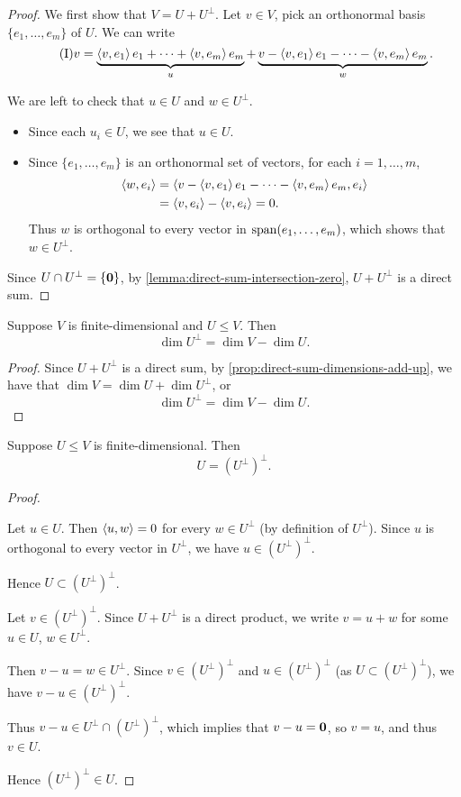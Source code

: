 \begin{proof}
We first show that $V=U+U^\perp$. Let $v\in V$, pick an orthonormal basis $\{e_1,\dots,e_m\}$ of $U$. We can write
\begin{equation*}\tag{I}
v=\underbrace{\left\langle v,e_1\right\rangle e_1+\cdots+\left\langle v,e_m\right\rangle e_m}_{u}+\underbrace{v-\left\langle v,e_1\right\rangle e_1-\cdots-\left\langle v,e_m\right\rangle e_m}_{w}.
\end{equation*}

We are left to check that $u\in U$ and $w\in U^\perp$.
\begin{itemize}
\item Since each $u_i\in U$, we see that $u\in U$.
\item Since $\{e_1,\dots,e_m\}$ is an orthonormal set of vectors, for each $i=1,\dots,m$,
\begin{align*}
\left\langle w,e_i\right\rangle
&=\left\langle v-\left\langle v,e_1\right\rangle e_1-\cdots-\left\langle v,e_m\right\rangle e_m,e_i\right\rangle\\
&=\left\langle v,e_i\right\rangle-\left\langle v,e_i\right\rangle=0.
\end{align*}
Thus $w$ is orthogonal to every vector in $\operatorname{span}(e_1,\dots,e_m)$, which shows that $w\in U^\perp$.
\end{itemize}

Since $U\cap U^\perp=\{\vb{0}\}$, by \ref{lemma:direct-sum-intersection-zero}, $U+U^\perp$ is a direct sum.
\end{proof}

\begin{corollary}
Suppose $V$ is finite-dimensional and $U\le V$. Then
\[\dim U^\perp=\dim V-\dim U.\]
\end{corollary}

\begin{proof}
Since $U+U^\perp$ is a direct sum, by \ref{prop:direct-sum-dimensions-add-up}, we have that $\dim V=\dim U+\dim U^\perp$, or
\[\dim U^\perp=\dim V-\dim U.\]
\end{proof}

\begin{corollary}
Suppose $U\le V$ is finite-dimensional. Then
\[U=(U^\perp)^\perp.\]
\end{corollary}

\begin{proof} \

\fbox{$\subset$} Let $u\in U$. Then $\left\langle u,w\right\rangle=0$ for every $w\in U^\perp$ (by definition of $U^\perp$). Since $u$ is orthogonal to every vector in $U^\perp$, we have $u\in(U^\perp)^\perp$.

Hence $U\subset(U^\perp)^\perp$.

\fbox{$\supset$} Let $v\in(U^\perp)^\perp$. Since $U+U^\perp$ is a direct product, we write $v=u+w$ for some $u\in U$, $w\in U^\perp$.

Then $v-u=w\in U^\perp$. Since $v\in(U^\perp)^\perp$ and $u\in(U^\perp)^\perp$ (as $U\subset(U^\perp)^\perp$), we have $v-u\in(U^\perp)^\perp$. 

Thus $v-u\in U^\perp\cap(U^\perp)^\perp$, which implies that $v-u=\vb{0}$, so $v=u$, and thus $v\in U$. 

Hence $(U^\perp)^\perp\in U$.
\end{proof}

